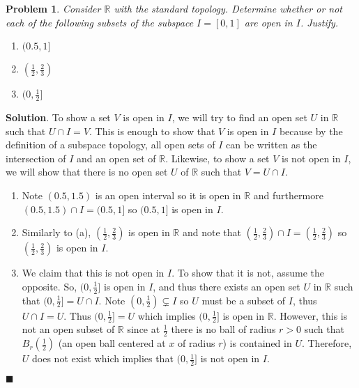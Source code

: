 \documentclass[12pt]{article}
\renewcommand{\=}[1]{\stackrel{#1}{=}} %
\providecommand{\RR}{\mathbb{R}}
\newtheorem{p}{Problem}[section]
\theoremstyle{definition}
\newenvironment{s}{%
        \begin{trivlist} \item \textbf{Solution}. }{%
            \hspace*{\fill} $\blacksquare$\end{trivlist}}%
\begin{document}
\begin{p}
    Consider $\RR$ with the standard topology. Determine whether or not each of the following subsets of the subspace $I = [0,1]$ are open
    in $I$. Justify.
    \begin{enumerate}
        \item[(a)] $(0.5,1]$
        \item[(b)] $(\frac{1}{2}, \frac{2}{3})$
        \item[(c)] $(0,\frac{1}{2}]$
    \end{enumerate}
\end{p}
\begin{s}
    To show a set $V$ is open in $I$, we will try to find an open set $U$ in $\RR$ such that $U\cap I = V$. This is enough to show that $V$ is 
    open in $I$
    because by the definition of a subspace topology, all open sets of $I$ can be written as the intersection of $I$ and an open set of
    $\RR$. Likewise, to show a set $V$ is not open in $I$, we will show that there is no open set $U$ of $\RR$ such that $V = U \cap I$.
    \begin{enumerate}
        \item[(a)] Note $(0.5,1.5)$ is an open interval so it is open in $\RR$ and furthermore $(0.5,1.5)\cap I = (0.5,1]$ so $(0.5,1]$ is
            open in $I$.
        \item[(b)] Similarly to (a), $(\frac{1}{2},\frac{2}{3})$ is open in $\RR$ and note that $(\frac{1}{2},\frac{2}{3})\cap I = 
            (\frac{1}{2},\frac{2}{3})$ so $(\frac{1}{2},\frac{2}{3})$ is open in $I$.
        \item[(c)] We claim that this is not open in $I$. To show that it is not, assume the opposite. So, $(0,\frac{1}{2}]$ is open
            in $I$, and thus there exists an open set $U$ in $\RR$ such that $(0,\frac{1}{2}] = U \cap I$. Note $(0,\frac{1}{2})\subsetneq I$
            so $U$ must be a subset of $I$, thus $U \cap I = U$. Thus $(0,\frac{1}{2}] = U$ which implies $(0,\frac{1}{2}]$ is open in $\RR$.
            However, this is not an open subset of $\RR$ since at $\frac{1}{2}$ there is no ball of radius $r>0$ such that $B_r(\frac{1}{2})$
            (an open ball centered at $x$ of radius $r$) is contained in $U$. Therefore, $U$ does not exist which implies that
            $(0,\frac{1}{2}]$ is not open in $I$.
    \end{enumerate}
\end{s}
\end{document}
